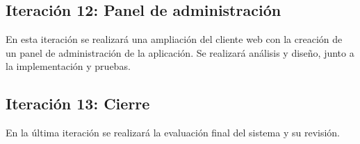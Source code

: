 \subsection{Iteración 12: Panel de administración}
En esta iteración se realizará una ampliación del cliente web con la creación de un panel de administración de la aplicación. Se realizará análisis y diseño, junto a la implementación y pruebas.


\subsection{Iteración 13: Cierre}
En la última iteración se realizará la evaluación final del sistema y su revisión.






